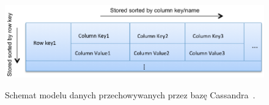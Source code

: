 \begin{figure}[!ht]
 \begin{center}
  \scalebox{0.45}
  {
   \includegraphics{figures/generated_app_type/cassandra_model.png}
  }
 \end{center}
 \caption{Schemat modelu danych przechowywanych przez bazę Cassandra~\cite{cassandra_model}.}
 \label{fig:cassandra_model}
\end{figure}
